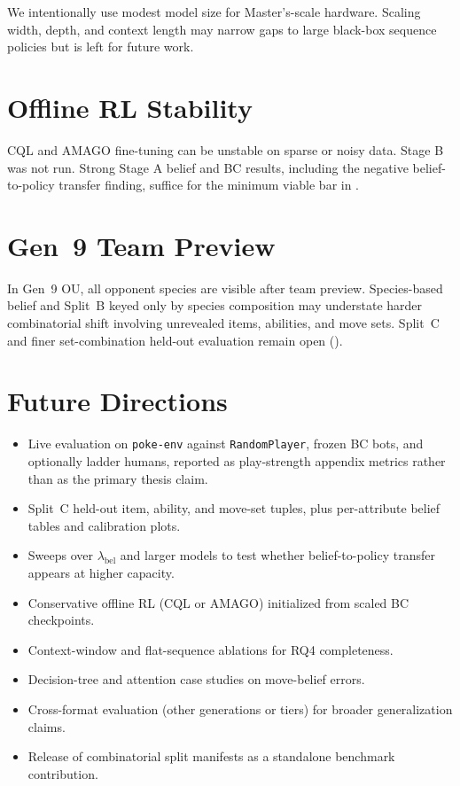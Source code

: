 We intentionally use modest model size for Master's-scale hardware. Scaling
width, depth, and context length may narrow gaps to large black-box sequence
policies \citep{grigsby2025metamon} but is left for future work.

\section{Offline RL Stability}

CQL and AMAGO fine-tuning can be unstable on sparse or noisy data. Stage B was
not run. Strong Stage A belief and BC results, including the negative
belief-to-policy transfer finding, suffice for the minimum viable bar in
.

\section{Gen~9 Team Preview}

In Gen~9 OU, all opponent species are visible after team preview. Species-based
belief and Split~B keyed only by species composition may understate harder
combinatorial shift involving unrevealed items, abilities, and move sets.
Split~C and finer set-combination held-out evaluation remain open
().

\section{Future Directions}

\begin{itemize}
  \item Live evaluation on \texttt{poke-env} against \texttt{RandomPlayer},
    frozen BC bots, and optionally ladder humans, reported as play-strength
    appendix metrics rather than as the primary thesis claim.
  \item Split~C held-out item, ability, and move-set tuples, plus per-attribute
    belief tables and calibration plots.
  \item Sweeps over $\lambda_\mathrm{bel}$ and larger models to test whether
    belief-to-policy transfer appears at higher capacity.
  \item Conservative offline RL (CQL or AMAGO) initialized from scaled BC
    checkpoints.
  \item Context-window and flat-sequence ablations for RQ4 completeness.
  \item Decision-tree and attention case studies on move-belief errors.
  \item Cross-format evaluation (other generations or tiers) for broader
    generalization claims.
  \item Release of combinatorial split manifests as a standalone benchmark
    contribution.
\end{itemize}
